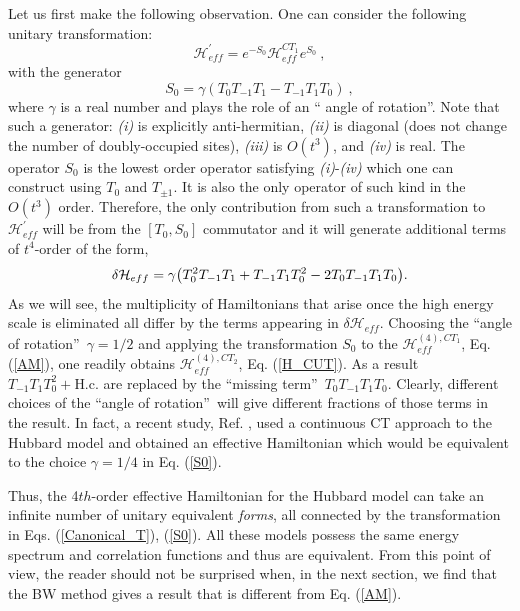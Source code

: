 \documentclass[floatfix,twocolumn,aps,prb,showpacs,superscriptaddress]{revtex4}
\def\tone{T_1}
\def\tzero{T_0}
\begin{document}
\label{addCT} %
Let us first make the following observation. One can consider the following
unitary transformation:
\begin{equation}
\mathcal{H}_{eff}^{\prime }=e^{-S_{0}}\mathcal{H}_{eff}^{CT_{1}}e^{S_{0}}\ ,
\label{Canonical_T}
\end{equation}%
with the generator
\begin{equation}
S_{0}=\gamma (T_{0}T_{-1}T_{1}-T_{-1}T_{1}T_{0})\ ,  \label{S0}
\end{equation}%
where $\gamma $ is a real number and plays the role of an \textquotedblleft
angle of rotation\textquotedblright . Note that such a generator: \textit{%
(i)} is explicitly anti-hermitian, \textit{(ii)} is diagonal (does not change the
number of doubly-occupied sites), \textit{(iii)} is $O(t^{3})$, and
\textit{(iv)} is real. The operator $S_0$ is the lowest order operator
satisfying \textit{(i)}-\textit{(iv)}
which one can construct using $T_{0}$ and $T_{\pm 1}$. It is also the only
operator of such kind in the $O(t^{3})$ order. Therefore, the only
contribution from such a transformation to $\mathcal{H}_{eff}^{\prime }$
will be from the $[T_{0},S_{0}]$ commutator and it will generate additional
terms of $t^{4}$-order of the form,
\begin{eqnarray}
\delta \mathcal{H}_{eff}=\gamma
\big(\tzero^2\tm\tone+\tm\tone\tzero^2-2\tzero\tm\tone\tzero\big) . 
\label{Canonical_T_explicit}
\end{eqnarray}%
As we will see, the multiplicity of Hamiltonians that arise once the
high energy scale is eliminated all differ by the terms appearing in
$\delta \mathcal{H}_{eff}$. 
Choosing the \textquotedblleft angle of rotation\textquotedblright\ $\gamma
=1/2$ and applying the transformation $S_{0}$ to the $\mathcal{H}%
_{eff}^{(4),CT_{1}}$, Eq. (\ref{AM}), one readily obtains $\mathcal{H}%
_{eff}^{(4),CT_{2}}$, Eq. (\ref{H_CUT}). As a result $T_{-1}T_{1}\tzero^2+%
\mbox{H.c.}$ are replaced by the \textquotedblleft missing
term\textquotedblright\ $T_{0}T_{-1}T_{1}T_{0}$. Clearly, different choices
of the \textquotedblleft angle of rotation\textquotedblright\ will give
different fractions of those terms in the result. In fact, a recent study,
Ref.
%
, used a continuous CT approach to the Hubbard model and obtained an
effective Hamiltonian which would be equivalent to the choice $\gamma =1/4$
in Eq. (\ref{S0}).


Thus, the 4$th$-order effective Hamiltonian for the Hubbard model can take
an infinite number of unitary equivalent \textit{forms}, all connected by
the transformation in Eqs. (\ref{Canonical_T}), (\ref{S0}). All these models
possess the same energy spectrum and correlation functions and thus are
equivalent. From this point of view, the reader should not be surprised
when, in the next section, we find that the BW method gives a result that is
different from Eq. (\ref{AM}).
\end{document}

